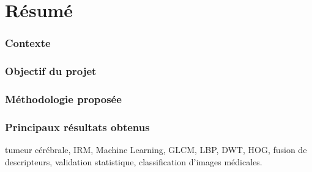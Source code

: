 \chapter*{Résumé}

\subsection*{Contexte}
\aCompleter

\subsection*{Objectif du projet}
\aCompleter

\subsection*{Méthodologie proposée}
\aCompleter

\subsection*{Principaux résultats obtenus}
\aCompleter

\begin{notebox}
tumeur cérébrale, IRM, Machine Learning, GLCM, LBP, DWT, HOG, fusion de descripteurs,
validation statistique, classification d'images médicales.
\end{notebox}
\newpage

